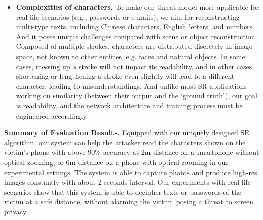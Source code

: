\begin{itemize}[leftmargin=*]
  \item \textbf{Complexities of characters.} To make our threat model more applicable for real-life scenarios (e.g., passwords or e-mails), we aim for reconstructing multi-type texts, including Chinese characters, English letters, and numbers. And it poses unique challenges compared with scene or object reconstruction. Composed of multiple strokes, characters are distributed discretely in image space, not known to other entities, e.g. faces and natural objects. In some cases, messing up a stroke will not impact its readability, and in other cases shortening or lengthening a stroke even slightly will lead to a different character, leading to misunderstandings. And unlike most SR applications working on similarity (between their output and the ‘ground truth’), our goal is readability, and the network architecture and training process must be engineered accordingly.
\end{itemize}

\vspace{1mm}
\noindent
\textbf{Summary of Evaluation Results.}
Equipped with our uniquely designed SR algorithm, our system can help the attacker read the characters shown on the victim's phone with above 90\% accuracy at 2m distance on a smartphone without optical zooming, or 6m distance on a phone with optical zooming in our experimental settings. The system is able to capture photos and produce high-res images constantly with about 2 seconds interval. Our experiments with real life scenarios show that this system is able to decipher texts or passwords of the victim at a safe distance, without alarming the victim, posing a threat to screen privacy.


